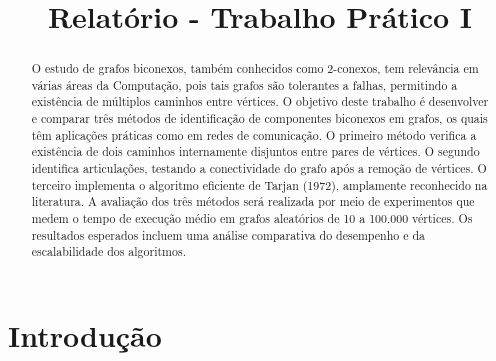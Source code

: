 \documentclass[10pt,conference]{IEEEtran}
\begin{document}
\title{Relatório - Trabalho Prático I}

\newif\iffinal
\finalfalse
\finaltrue
\newcommand{\jemsid}{99999}

\iffinal
\author{
\and
{}
}


\else
  \author{Sibgrapi paper ID: \jemsid \\ }
\fi


\maketitle

\begin{abstract}
O estudo de grafos biconexos, também conhecidos como 2-conexos, tem relevância em várias áreas da Computação, pois tais grafos são tolerantes a falhas, permitindo a existência de múltiplos caminhos entre vértices. O objetivo deste trabalho é desenvolver e comparar três métodos de identificação de componentes biconexos em grafos, os quais têm aplicações práticas como em redes de comunicação. O primeiro método verifica a existência de dois caminhos internamente disjuntos entre pares de vértices. O segundo identifica articulações, testando a conectividade do grafo após a remoção de vértices. O terceiro implementa o algoritmo eficiente de Tarjan (1972)\cite{4569669}, amplamente reconhecido na literatura. A avaliação dos três métodos será realizada por meio de experimentos que medem o tempo de execução médio em grafos aleatórios de 10 a 100.000 vértices. Os resultados esperados incluem uma análise comparativa do desempenho e da escalabilidade dos algoritmos.
\end{abstract}
\IEEEpeerreviewmaketitle

\section{Introdução}
\end{document}
